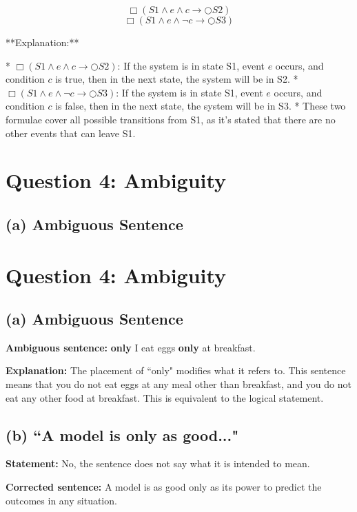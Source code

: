 \documentclass{article}
\begin{document}
\[
\Box(S1 \land e \land c \rightarrow \bigcirc S2)
\]
\[
\Box(S1 \land e \land \neg c \rightarrow \bigcirc S3)
\]

**Explanation:**

* $\Box(S1 \land e \land c \rightarrow \bigcirc S2)$: If the system is in state S1, event $e$ occurs, and condition $c$ is true, then in the next state, the system will be in S2.
* $\Box(S1 \land e \land \neg c \rightarrow \bigcirc S3)$: If the system is in state S1, event $e$ occurs, and condition $c$ is false, then in the next state, the system will be in S3.
* These two formulae cover all possible transitions from S1, as it's stated that there are no other events that can leave S1.

\section*{Question 4: Ambiguity}

\subsection*{(a) Ambiguous Sentence}

\section*{Question 4: Ambiguity}

\subsection*{(a) Ambiguous Sentence}

\textbf{Ambiguous sentence:} \textbf{only} I eat eggs \textbf{only} at breakfast.

\textbf{Explanation:} The placement of ``only" modifies what it refers to. This sentence means that you do not eat eggs at any meal other than breakfast, and you do not eat any other food at breakfast. This is equivalent to the logical statement.

\subsection*{(b) ``A model is only as good..."}

\textbf{Statement:} No, the sentence does not say what it is intended to mean.

\textbf{Corrected sentence:} A model is as good only as its power to predict the outcomes in any situation.
\end{document}

